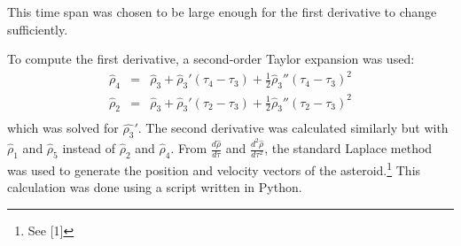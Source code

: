 \documentclass[12pt,journal,compsoc]{IEEEtran}
\begin{document}
This time span was chosen to be large enough for the first derivative to change sufficiently.


To compute the first derivative, a second-order Taylor expansion was used:
\begin{eqnarray*}
\hat{\rho}_4&=&\hat{\rho}_3+\hat{\rho}_3' (\tau_4-\tau_3)+\frac{1}{2}\hat{\rho}_3'' (\tau_4-\tau_3)^2\\
\hat{\rho}_2&=&\hat{\rho}_3+\hat{\rho}_3' (\tau_2-\tau_3)+\frac{1}{2}\hat{\rho}_3'' (\tau_2-\tau_3) ^2\\
\end{eqnarray*}
which was solved for $\hat{\rho_3}'$.
The second derivative was calculated similarly but with $\hat{\rho}_1$ and $\hat{\rho}_5$ 
instead of $\hat{\rho}_2$ and $\hat{\rho}_4$.
From $\frac{d\hat{\rho}}{d\tau}$ and $\frac{d^2\hat{\rho}}{d\tau^2}$, 
the standard Laplace method was used to generate the position and velocity vectors of the asteroid.\footnote{See [1]}
This calculation was done using a script written in Python.
\end{document}
